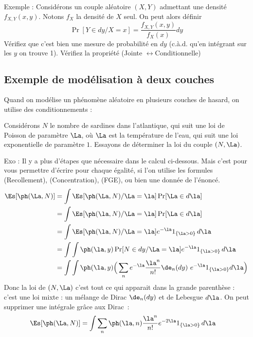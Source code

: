 \documentclass{article}
\begin{document}
 
 

Exemple : Considérons un couple aléatoire $(X,Y)$ admettant une densité $f_{X,Y}(x,y)$.    Notons $f_X$ la densité de $X$ seul.
 On peut alors définir
$$
\Pr[Y \in dy / X=x] =  \frac {f_{X,Y} (x,y) } {f_X(x) }  dy
$$
Vérifiez que c'est bien une mesure de probabilité en $dy$ (c.à.d. qu'en intégrant sur les $y$ on trouve 1).   Vérifiez  la propriété (Jointe $\leftrightarrow$Conditionnelle)





\subsection{Exemple de modélisation à deux couches}

Quand on modélise un phénomène aléatoire en plusieurs couches de hasard, on utilise  des conditionnements : 

Considérons $N$ le nombre de sardines dans l'atlantique, qui suit une loi de Poisson de paramètre $\La$, où $\La$ est la température de l'eau, qui suit une loi exponentielle de paramètre $1$.    Essayons de déterminer la loi du couple $(N ,\La)$. 

Exo : Il y a plus d'étapes que nécessaire dans le calcul ci-dessous. Mais c'est pour vous permettre d'écrire  pour chaque égalité, si l'on utilise les formules (Recollement),  (Concentration),    (FGE), ou bien une donnée de l'énoncé.
\begin{alignat*}{1}
\Es[\ph(\La ,N )]& = \int  \Es[\ph(\La,N) / \La = \la   ] \Pr[\La \in d\la ] \\
& = \int  \Es[\ph( \la  , N )  / \La=\la   ]  \Pr[\La \in d\la ]   \\ 
& = \int  \Es[\ph( \la  , N )  / \La=\la   ]   e^{- \la } 1_{\{\la >0\}}\, d\la  \\ 
& = \int \int   \ph( \la  , y )   \Pr[N\in dy / \La=\la]   e^{- \la } 1_{\{\la >0\}}\, d\la  \\ 
& = \int \int   \ph( \la  , y )     \Big( \sum_n  e^{- \la }  \frac  {\la^n}{n !}       \de_n(dy)      \     e^{- \la } 1_{\{\la >0\}}    d\la  \Big)   \\ 
\end{alignat*}
Donc la loi de $(N,\La)$ c'est tout ce qui apparait dans la grande parenthèse : c'est une loi mixte :  un mélange de Dirac $\de_n(dy)$ et de Lebesgue $d\la$.  On peut supprimer une intégrale grâce aux Dirac~:
\begin{alignat*}{1}
\Es[\ph(\La, N )] & = \int  \sum_n   \ph( \la,  n  )      \frac  {\la^n}{n !}       e^{- 2\la } 1_{\{\la >0\}}\, d\la    
\end{alignat*}
\end{document}

